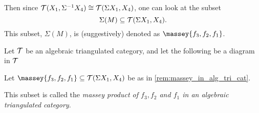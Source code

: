 \begin{remark}
    Then since \( {\mathcal{T}}(X_1, \Sigma^{-1} X_4) \cong {\mathcal{T}}(\Sigma X_1, X_4) \), one can look at the subset
    \[
        \Sigma(M) \subseteq {\mathcal{T}}(\Sigma X_1, X_4).
    \]
    This subset, \( \Sigma(M) \), is (suggestively) denoted as \( \massey{f_3, f_2, f_1} \).
\end{remark}

\begin{definition}
    Let \( {\mathcal{T}} \) be an algebraic triangulated category, and let the following be a diagram in \( {\mathcal{T}} \)
    \begin{center}
    \end{center}
    Let \( \massey{f_3, f_2, f_1} \subseteq \Tc(\Sigma X_1, X_4) \) be as in \autoref{rem:massey_in_alg_tri_cat}.

    This subset is called the \emph{massey product of \( f_3, f_2 \) and \( f_1 \) in an algebraic triangulated category}.
\end{definition}




